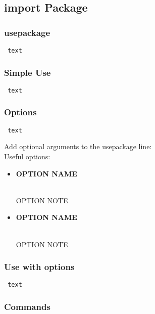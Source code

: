 \documentclass[class=article , crop=false, titlepage, twoside, multi={itemize, figure, verbatim}, float=false]{standalone}
\title{}  %
\begin{document}

\ifstandalone
\maketitle %
\clearpage
\tableofcontents %
\clearpage
\fi

\clearpage

\subsection[import Package]{\LARGE import Package}

\subsubsection[usepackage]{\Large usepackage}
\begin{verbatim} text \end{verbatim}

\subsubsection[Simple Use]{\Large Simple Use}
\begin{verbatim} text \end{verbatim}

\subsubsection[Options]{\Large Options}
\begin{verbatim} text \end{verbatim}
Add optional arguments to the usepackage line:\\
Useful options:\begin{itemize}
\item \begin{large}\textbf{OPTION NAME}\end{large}\\OPTION NOTE
\item \begin{large}\textbf{OPTION NAME}\end{large}\\OPTION NOTE
\end{itemize}

\subsubsection[Use with Options]{\Large Use with options}
\begin{verbatim} text \end{verbatim}

\subsubsection[Commands]{\Large Commands}
\end{document}
